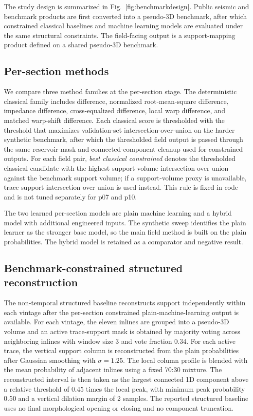 \documentclass[preprint,12pt]{elsarticle}
\begin{document}
The study design is summarized in Fig.~\ref{fig:benchmarkdesign}. Public seismic and benchmark products are first converted into a pseudo-3D benchmark, after which constrained classical baselines and machine learning models are evaluated under the same structural constraints. The field-facing output is a support-mapping product defined on a shared pseudo-3D benchmark.

\subsection{Per-section methods}

We compare three method families at the per-section stage. The deterministic classical family includes difference, normalized root-mean-square difference, impedance difference, cross-equalized difference, local warp difference, and matched warp-shift difference. Each classical score is thresholded with the threshold that maximizes validation-set intersection-over-union on the harder synthetic benchmark, after which the thresholded field output is passed through the same reservoir-mask and connected-component cleanup used for constrained outputs. For each field pair, \emph{best classical constrained} denotes the thresholded classical candidate with the highest support-volume intersection-over-union against the benchmark support volume; if a support-volume proxy is unavailable, trace-support intersection-over-union is used instead. This rule is fixed in code and is not tuned separately for p07 and p10.

The two learned per-section models are plain machine learning and a hybrid model with additional engineered inputs. The synthetic sweep identifies the plain learner as the stronger base model, so the main field method is built on the plain probabilities. The hybrid model is retained as a comparator and negative result.

\subsection{Benchmark-constrained structured reconstruction}

The non-temporal structured baseline reconstructs support independently within each vintage after the per-section constrained plain-machine-learning output is available. For each vintage, the eleven inlines are grouped into a pseudo-3D volume and an active trace-support mask is obtained by majority voting across neighboring inlines with window size 3 and vote fraction 0.34. For each active trace, the vertical support column is reconstructed from the plain probabilities after Gaussian smoothing with $\sigma=1.25$. The local column profile is blended with the mean probability of adjacent inlines using a fixed 70:30 mixture. The reconstructed interval is then taken as the largest connected 1D component above a relative threshold of 0.45 times the local peak, with minimum peak probability 0.50 and a vertical dilation margin of 2 samples. The reported structured baseline uses no final morphological opening or closing and no component truncation.
\end{document}
